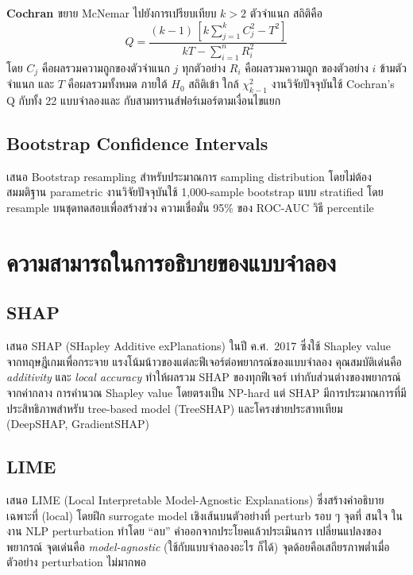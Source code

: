 \textbf{Cochran \cite{cochran1950}} ขยาย McNemar ไปยังการเปรียบเทียบ $k > 2$
ตัวจำแนก สถิติคือ
\begin{equation}
Q = \frac{(k-1)\,\left[k \sum_{j=1}^{k} C_j^2 - T^2\right]}{kT - \sum_{i=1}^{n} R_i^2}
\label{eq:cochranq}
\end{equation}
โดย $C_j$ คือผลรวมความถูกของตัวจำแนก $j$ ทุกตัวอย่าง $R_i$ คือผลรวมความถูก
ของตัวอย่าง $i$ ข้ามตัวจำแนก และ $T$ คือผลรวมทั้งหมด ภายใต้ $H_0$ สถิติเข้า
ใกล้ $\chi^2_{k-1}$ งานวิจัยปัจจุบันใช้ Cochran's Q กับทั้ง 22 แบบจำลองและ
กับสามทรานส์ฟอร์เมอร์ตามเงื่อนไขแยก

\subsection{Bootstrap Confidence Intervals}

\textcite{efron1979bootstrap} เสนอ Bootstrap resampling สำหรับประมาณการ
sampling distribution โดยไม่ต้องสมมติฐาน parametric งานวิจัยปัจจุบันใช้
1{,}000-sample bootstrap แบบ stratified โดย resample บนชุดทดสอบเพื่อสร้างช่วง
ความเชื่อมั่น 95\% ของ ROC-AUC วิธี percentile

\section{ความสามารถในการอธิบายของแบบจำลอง}
\label{sec:lit-xai}

\subsection{SHAP}

\textbf{\textcite{lundberg2017shap}} เสนอ SHAP (SHapley Additive
exPlanations) ในปี ค.ศ.\ 2017 ซึ่งใช้ Shapley value จากทฤษฎีเกมเพื่อกระจาย
แรงโน้มน้าวของแต่ละฟีเจอร์ต่อพยากรณ์ของแบบจำลอง คุณสมบัติเด่นคือ
\emph{additivity} และ \emph{local accuracy} ทำให้ผลรวม SHAP ของทุกฟีเจอร์
เท่ากับส่วนต่างของพยากรณ์จากค่ากลาง การคำนวณ Shapley value โดยตรงเป็น NP-hard
แต่ SHAP มีการประมาณการที่มีประสิทธิภาพสำหรับ tree-based model (TreeSHAP)
และโครงข่ายประสาทเทียม (DeepSHAP, GradientSHAP)

\subsection{LIME}

\textbf{\textcite{ribeiro2016should}} เสนอ LIME (Local
Interpretable Model-Agnostic Explanations) ซึ่งสร้างคำอธิบายเฉพาะที่
(local) โดยฝึก surrogate model เชิงเส้นบนตัวอย่างที่ perturb รอบ ๆ จุดที่
สนใจ ในงาน NLP perturbation ทำโดย ``ลบ'' คำออกจากประโยคแล้วประเมินการ
เปลี่ยนแปลงของพยากรณ์ จุดเด่นคือ \emph{model-agnostic} (ใช้กับแบบจำลองอะไร
ก็ได้) จุดด้อยคือเสถียรภาพต่ำเมื่อตัวอย่าง perturbation ไม่มากพอ

